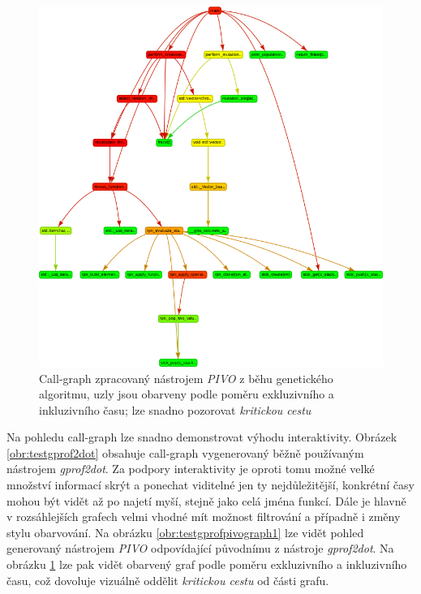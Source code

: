 \documentclass[czech,BP]{thesiskiv}
\begin{document}
\begin{figure}[h]
    \centering
    \includegraphics[interpolate,width=1.0\textwidth]{img/test-ga-pivo-graph-ratio.png}
    \caption{Call-graph zpracovaný nástrojem \emph{PIVO} z běhu genetického algoritmu, uzly jsou obarveny podle poměru exkluzivního a inkluzivního času; lze snadno pozorovat \emph{kritickou cestu}}
    \label{obr:testgprofpivograph2}
\end{figure}

\newpage

Na pohledu call-graph lze snadno demonstrovat výhodu interaktivity. Obrázek \ref{obr:testgprof2dot} obsahuje call-graph vygenerovaný běžně používaným nástrojem \emph{gprof2dot}. Za podpory interaktivity je oproti tomu možné velké množství informací skrýt a ponechat viditelné jen ty nejdůležitější, konkrétní časy mohou být vidět až po najetí myší, stejně jako celá jména funkcí. Dále je hlavně v rozsáhlejších grafech velmi vhodné mít možnost filtrování a případně i změny stylu obarvování. Na obrázku \ref{obr:testgprofpivograph1} lze vidět pohled generovaný nástrojem \emph{PIVO} odpovídající původnímu z nástroje \emph{gprof2dot}. Na obrázku \ref{obr:testgprofpivograph2} lze pak vidět obarvený graf podle poměru exkluzivního a inkluzivního času, což dovoluje vizuálně oddělit \emph{kritickou cestu} od  části grafu.
\end{document}
